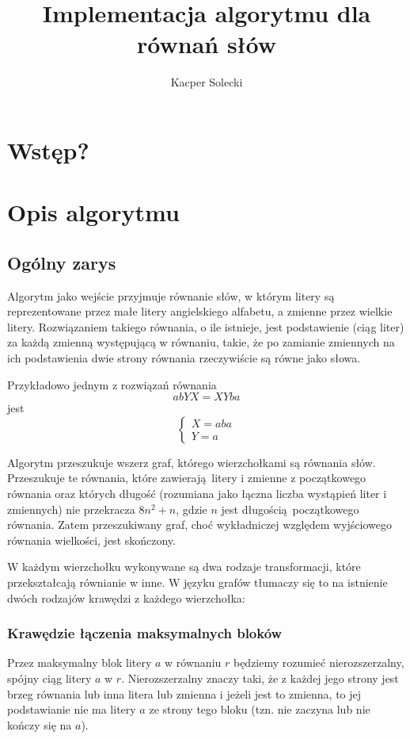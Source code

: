 \documentclass[leqno, 12pt]{article}
\title{Implementacja algorytmu dla równań słów}
\author{Kacper Solecki}
\date{}
\begin{document}
\maketitle

\section{Wstęp?}
\section{Opis algorytmu}

\subsection{Ogólny zarys}
Algorytm jako wejście przyjmuje równanie słów, w którym litery są reprezentowane przez małe litery angielskiego alfabetu, a zmienne przez wielkie litery. Rozwiązaniem takiego równania, o ile istnieje,
jest podstawienie (ciąg liter) za każdą zmienną występującą w równaniu, takie, że po zamianie zmiennych na ich podstawienia dwie strony równania rzeczywiście są równe jako słowa.

Przykładowo jednym z rozwiązań równania $$abYX = XYba$$ jest
$$
\begin{cases}
X = aba \\
Y = a
\end{cases}
$$

Algorytm przeszukuje wszerz graf, którego wierzchołkami są równania słów. 
Przeszukuje te równania, które zawierają litery i zmienne z początkowego równania oraz których długość (rozumiana jako łączna liczba wystąpień liter i zmiennych) nie przekracza $8n^2 + n$, gdzie $n$ jest długością początkowego równania. Zatem przeszukiwany graf, choć wykładniczej względem wyjściowego równania wielkości, jest skończony.

W każdym wierzchołku wykonywane są dwa rodzaje transformacji, które przekształcają równianie w inne. W języku grafów tłumaczy się to na istnienie dwóch rodzajów krawędzi z każdego wierzchołka:

\subsubsection*{Krawędzie łączenia maksymalnych bloków}
Przez maksymalny blok litery $a$ w równaniu $r$ będziemy rozumieć nierozszerzalny, spójny ciąg litery $a$ w $r$. Nierozszerzalny znaczy taki, że z każdej jego strony jest brzeg równania lub inna litera lub zmienna i jeżeli jest to zmienna, to jej podstawianie nie ma litery $a$ ze strony tego bloku (tzn. nie zaczyna lub nie kończy się na $a$).
\end{document}
